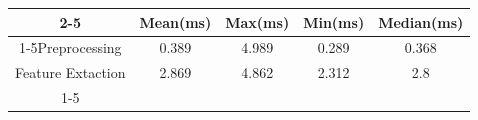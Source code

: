 \documentclass{standalone}
\begin{document}
 
 \begin{tabular}{|c |c |c |c |c |}
\cline{2-5}\cline{2-5} \multicolumn{1}{c |}{ } & Mean(ms) & Max(ms) & Min(ms) & Median(ms)\\ 
\cline{1-5}Preprocessing & 0.389 & 4.989 & 0.289 & 0.368\\ 
 \hhline{|=|=|=|=|=|}Feature Extaction & 2.869 & 4.862 & 2.312 & 2.8\\ 
 \cline{1-5}\hline \end{tabular}
 
\end{document}
